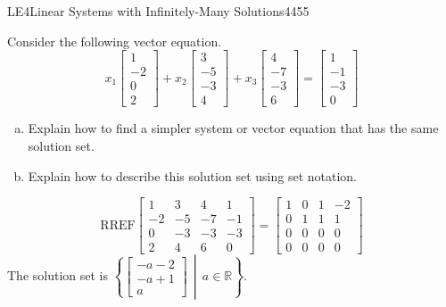 \begin{exercise}{LE4}{Linear Systems with Infinitely-Many Solutions}{4455} 
\begin{exerciseStatement} 

 Consider the following vector equation. \[       
        x_{1} \left[\begin{array}{c}
1 \\
-2 \\
0 \\
2
\end{array}\right] + x_{2} \left[\begin{array}{c}
3 \\
-5 \\
-3 \\
4
\end{array}\right] + x_{3} \left[\begin{array}{c}
4 \\
-7 \\
-3 \\
6
\end{array}\right] = \left[\begin{array}{c}
1 \\
-1 \\
-3 \\
0
\end{array}\right]
      \] 

 

\begin{enumerate}[(a)]
\item  

 Explain how to find a simpler system or vector equation that has the same solution set. 

 
\item  

 Explain how to describe this solution set using set notation. 

 
\end{enumerate}

     \end{exerciseStatement}
 \begin{exerciseAnswer} 

 \[\mathrm{RREF}\left[\begin{array}{ccc|c}
1 & 3 & 4 & 1 \\
-2 & -5 & -7 & -1 \\
0 & -3 & -3 & -3 \\
2 & 4 & 6 & 0
\end{array}\right]=\left[\begin{array}{ccc|c}
1 & 0 & 1 & -2 \\
0 & 1 & 1 & 1 \\
0 & 0 & 0 & 0 \\
0 & 0 & 0 & 0
\end{array}\right]\] The solution set is \( \left\{ \left[\begin{array}{c}
-a - 2 \\
-a + 1 \\
a
\end{array}\right] \,\middle|\, a \in\mathbb R \right\} \). 

 \end{exerciseAnswer}
 \end{exercise}


